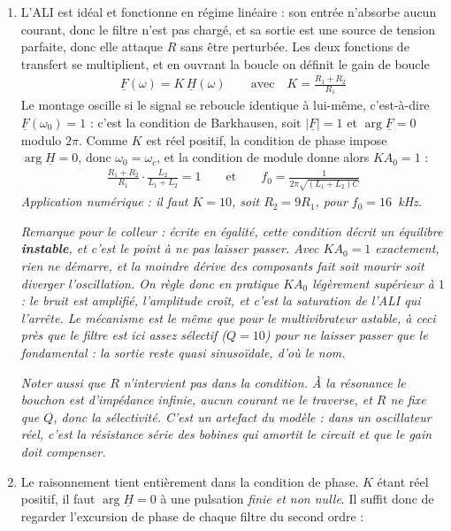 \begin{correction}
\begin{enumerate}
	\item L'ALI est idéal et fonctionne en régime linéaire : son entrée n'absorbe aucun courant, donc le filtre n'est pas chargé, et sa sortie est une source de tension parfaite, donc elle attaque $R$ sans être perturbée. Les deux fonctions de transfert se multiplient, et en ouvrant la boucle on définit le gain de boucle
	\begin{align*}
		\underline{F}(\omega)=K\,\underline{H}(\omega)
		\qquad\text{avec}\quad K=\frac{R_1+R_2}{R_1}
	\end{align*}
	Le montage oscille si le signal se reboucle identique à lui-même, c'est-à-dire $\underline{F}(\omega_0)=1$ : c'est la condition de Barkhausen, soit $|\underline{F}|=1$ et $\arg\underline{F}=0$ modulo $2\pi$. Comme $K$ est réel positif, la condition de phase impose $\arg\underline{H}=0$, donc $\omega_0=\omega_c$, et la condition de module donne alors $KA_0=1$ :
	\begin{align*}
		\boxed{\frac{R_1+R_2}{R_1}\cdot\frac{L_2}{L_1+L_2}=1
		\qquad\text{et}\qquad
		f_0=\frac{1}{2\pi\sqrt{(L_1+L_2)C}}}
	\end{align*}
	\textit{Application numérique : il faut $K=10$, soit $R_2=9R_1$, pour $f_0=16$~kHz.}

	\textit{Remarque pour le colleur : écrite en égalité, cette condition décrit un équilibre \textbf{instable}, et c'est le point à ne pas laisser passer. Avec $KA_0=1$ exactement, rien ne démarre, et la moindre dérive des composants fait soit mourir soit diverger l'oscillation. On règle donc en pratique $KA_0$ légèrement supérieur à $1$ : le bruit est amplifié, l'amplitude croît, et c'est la saturation de l'ALI qui l'arrête. Le mécanisme est le même que pour le multivibrateur astable, à ceci près que le filtre est ici assez sélectif ($Q=10$) pour ne laisser passer que le fondamental : la sortie reste quasi sinusoïdale, d'où le nom.}

	\textit{Noter aussi que $R$ n'intervient pas dans la condition. À la résonance le bouchon est d'impédance infinie, aucun courant ne le traverse, et $R$ ne fixe que $Q$, donc la sélectivité. C'est un artefact du modèle : dans un oscillateur réel, c'est la résistance série des bobines qui amortit le circuit et que le gain doit compenser.}

	\item Le raisonnement tient entièrement dans la condition de phase. $K$ étant réel positif, il faut $\arg\underline{H}=0$ à une pulsation \textit{finie et non nulle}. Il suffit donc de regarder l'excursion de phase de chaque filtre du second ordre :


\end{enumerate}
\end{correction}
